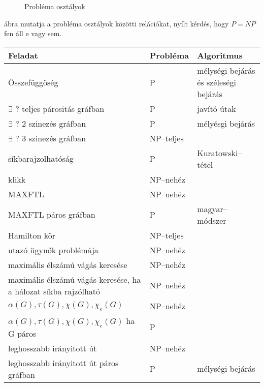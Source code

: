 \begin{figure}[htbp]
\caption{Probléma osztályok}
\label{fig:ProbOszt}
\centering
{}  
\end{figure}

 ábra mutatja a probléma osztályok közötti relációkat, nyílt
kérdés, hogy $P=NP$ fen áll e vagy sem.

\begin{table}
\begin{tabular}{|m{6.5cm}|m{2cm}|m{3.5cm}|}
\hline
Feladat & Probléma & Algoritmus \\
\hline\arrayrulecolor{lightgray}
Összefüggöség & P & mélységi bejárás és széleségi bejárás \\  \hline
$\exists$ ? teljes párositás gráfban & P & javító útak \\\hline
$\exists$ ? $2$ szinezés gráfban & P & mélyésgi bejárás \\\hline
$\exists$ ? $3$ szinezés gráfban & NP--teljes &\\\hline
síkbarajzolhatóság & P & Kuratowski--tétel\\\hline
klikk & NP--nehéz & \\\hline
MAXFTL & NP--nehéz &\\\hline
MAXFTL páros gráfban & P & magyar--módszer\\\hline
Hamilton kör & NP--teljes & \\\hline
utazó ügynők problémája & NP--nehéz & \\\hline
maximális élszámú vágás keresése & NP--nehéz &\\\hline
maximális élszámú vágás keresése, ha a hálozat síkba rajzólható& NP--nehéz &\\\hline
$\alpha(G), \tau(G), \chi(G), \chi_e(G)$ & NP--nehéz & \\\hline
$\alpha(G), \tau(G), \chi(G), \chi_e(G)$ ha G páros & P & \\\hline
leghosszabb irányitott út & NP--nehéz & \\\hline
leghosszabb irányitott út páros gráfban & P & mélységi bejárás \\
\hline
\end{tabular}
\end{table}

